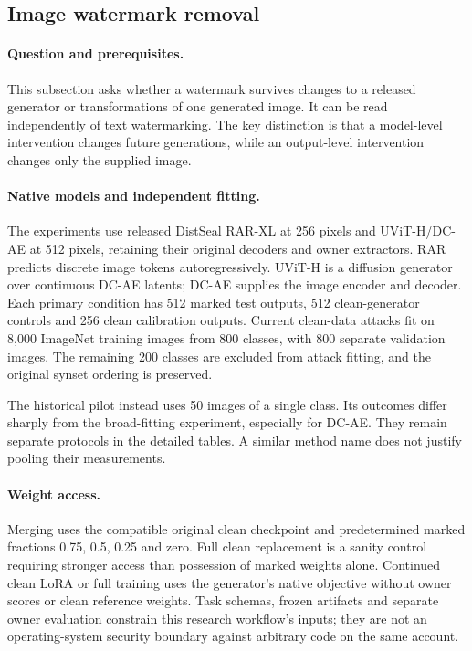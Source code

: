 \subsection{Image watermark removal}
\label{sec:image_watermarks}
\paragraph{Question and prerequisites.} This subsection asks whether a watermark survives changes to a released generator or transformations of one generated image. It can be read independently of text watermarking. The key distinction is that a model-level intervention changes future generations, while an output-level intervention changes only the supplied image.

\paragraph{Native models and independent fitting.} The experiments use released DistSeal RAR-XL at 256 pixels and UViT-H/DC-AE at 512 pixels, retaining their original decoders and owner extractors. RAR predicts discrete image tokens autoregressively. UViT-H is a diffusion generator over continuous DC-AE latents; DC-AE supplies the image encoder and decoder. Each primary condition has 512 marked test outputs, 512 clean-generator controls and 256 clean calibration outputs. Current clean-data attacks fit on 8,000 ImageNet training images from 800 classes, with 800 separate validation images. The remaining 200 classes are excluded from attack fitting, and the original synset ordering is preserved.

The historical pilot instead uses 50 images of a single class. Its outcomes differ sharply from the broad-fitting experiment, especially for DC-AE. They remain separate protocols in the detailed tables. A similar method name does not justify pooling their measurements.

\paragraph{Weight access.} Merging uses the compatible original clean checkpoint and predetermined marked fractions 0.75, 0.5, 0.25 and zero. Full clean replacement is a sanity control requiring stronger access than possession of marked weights alone. Continued clean LoRA or full training uses the generator's native objective without owner scores or clean reference weights. Task schemas, frozen artifacts and separate owner evaluation constrain this research workflow's inputs; they are not an operating-system security boundary against arbitrary code on the same account.

